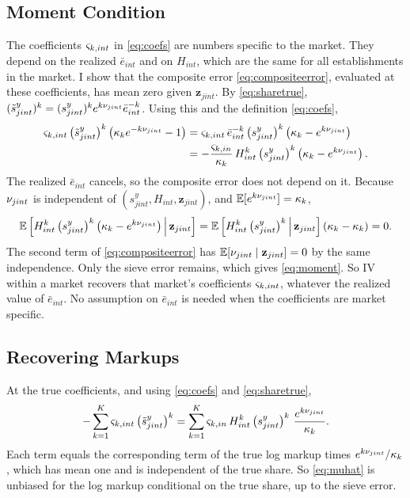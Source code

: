 \subsection{Moment Condition}\label{sec:app-moment}

The coefficients $\varsigma_{k,int}$ in \eqref{eq:coefs} are numbers specific to the market.
They depend on the realized $\bar{e}_{int}$ and on $H_{int}$, which are the same for all establishments in the market.
I show that the composite error \eqref{eq:compositeerror}, evaluated at these coefficients, has mean zero given $\mathbf{z}_{jint}$.
By \eqref{eq:sharetrue}, $(\tilde{s}^y_{jint})^k = (s^y_{jint})^k e^{k\nu_{jint}} \bar{e}_{int}^{-k}$.
Using this and the definition \eqref{eq:coefs},
\begin{align*}
	\varsigma_{k,int} \left(\tilde{s}^y_{jint}\right)^k \left(\kappa_k e^{-k\nu_{jint}} - 1\right)
	&= \varsigma_{k,int} \, \bar{e}_{int}^{-k} \left(s^y_{jint}\right)^k \left(\kappa_k - e^{k\nu_{jint}}\right) \\
	&= -\frac{\varsigma_{k,in}}{\kappa_k} \, H_{int}^k \left(s^y_{jint}\right)^k \left(\kappa_k - e^{k\nu_{jint}}\right).
\end{align*}
The realized $\bar{e}_{int}$ cancels, so the composite error does not depend on it.
Because $\nu_{jint}$ is independent of $(s^y_{jint}, H_{int}, \mathbf{z}_{jint})$, and $\mathbb{E}[e^{k\nu_{jint}}] = \kappa_k$,
\begin{equation*}
	\mathbb{E}\left[H_{int}^k \left(s^y_{jint}\right)^k \left(\kappa_k - e^{k\nu_{jint}}\right) \,\middle|\, \mathbf{z}_{jint}\right] = \mathbb{E}\left[H_{int}^k \left(s^y_{jint}\right)^k \,\middle|\, \mathbf{z}_{jint}\right] \left(\kappa_k - \kappa_k\right) = 0.
\end{equation*}
The second term of \eqref{eq:compositeerror} has $\mathbb{E}[\nu_{jint} \mid \mathbf{z}_{jint}] = 0$ by the same independence.
Only the sieve error remains, which gives \eqref{eq:moment}.
So IV within a market recovers that market's coefficients $\varsigma_{k,int}$, whatever the realized value of $\bar{e}_{int}$.
No assumption on $\bar{e}_{int}$ is needed when the coefficients are market specific.

\subsection{Recovering Markups}\label{sec:app-recovermu}

At the true coefficients, and using \eqref{eq:coefs} and \eqref{eq:sharetrue},
\begin{equation*}
	-\sum_{k=1}^{K} \varsigma_{k,int} \left(\tilde{s}^y_{jint}\right)^k = \sum_{k=1}^{K} \varsigma_{k,in} \, H_{int}^k \left(s^y_{jint}\right)^k \, \frac{e^{k\nu_{jint}}}{\kappa_k}.
\end{equation*}
Each term equals the corresponding term of the true log markup times $e^{k\nu_{jint}}/\kappa_k$, which has mean one and is independent of the true share.
So \eqref{eq:muhat} is unbiased for the log markup conditional on the true share, up to the sieve error.


